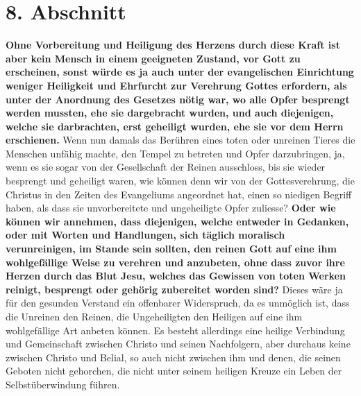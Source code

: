 \section{8. Abschnitt} \label{kap6_ab8}

\textbf{Ohne Vorbereitung und Heiligung des Herzens
durch diese Kraft ist aber kein
Mensch in einem geeigneten Zustand, vor Gott zu erscheinen, sonst würde es ja
auch unter der evangelischen Einrichtung weniger Heiligkeit und Ehrfurcht zur
Verehrung Gottes erfordern, als unter der Anordnung des Gesetzes nötig war, wo
alle Opfer besprengt werden mussten, ehe sie dargebracht wurden, und auch
diejenigen, welche sie darbrachten, erst geheiligt wurden, ehe sie vor dem
Herrn erschienen.}
Wenn nun damals das Berühren eines toten oder unreinen Tieres die Menschen
unfähig machte, den Tempel zu betreten und Opfer darzubringen, ja, wenn es sie
sogar von der Gesellschaft der Reinen ausschloss, bis sie wieder besprengt und
geheiligt waren, wie können denn wir von der Gottesverehrung, die Christus in
den Zeiten des Evangeliums angeordnet hat, einen so niedigen Begriff haben, als
dass sie unvorbereitete und ungeheiligte Opfer zuliesse?
\label{ref:06_08_moralisch_verunreinigt} \textbf{Oder wie können wir
annehmen, dass diejenigen, welche entweder in Gedanken, oder mit Worten und
Handlungen, sich täglich moralisch verunreinigen, im Stande sein sollten, den
reinen Gott auf eine ihm wohlgefällige Weise zu verehren und anzubeten, ohne
dass zuvor ihre Herzen durch das Blut Jesu, welches das Gewissen von toten
Werken reinigt, besprengt oder gehörig zubereitet worden
sind?}
Dieses wäre ja für den gesunden Verstand ein
offenbarer Widerspruch, da es unmöglich ist, dass die Unreinen den Reinen, die
Ungeheiligten den Heiligen auf eine ihm
wohlgefällige Art anbeten können. Es
besteht allerdings eine heilige Verbindung und Gemeinschaft
zwischen Christo
und seinen Nachfolgern, aber durchaus keine
zwischen
Christo
und Belial, so
auch nicht zwischen ihm und denen, die seinen Geboten nicht gehorchen, die nicht
unter seinem heiligen Kreuze ein Leben der
Selbstüberwindung führen.


